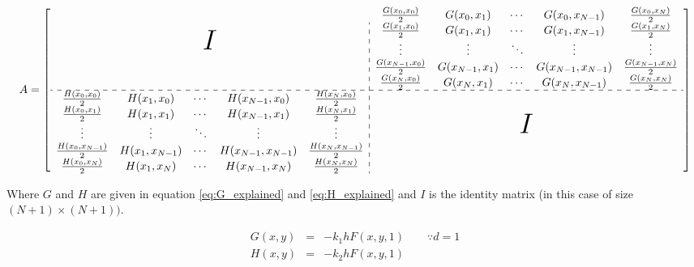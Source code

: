 \begin{landscape}

\begin{equation}
A = 
\left[
\begin{array}{*{5}{c}:*{5}{c}}
\multicolumn{5}{c}{\multirow{5}{*}{\Huge{$I$}}} 
& \frac{G(x_0,x_0)}{2}
& G(x_0,x_1)
& \cdots
& G(x_0,x_{N-1})
& \frac{G(x_0,x_N)}{2} \\

&&&&& \frac{G(x_1,x_0)}{2}
& G(x_1,x_1) 
& \cdots
& G(x_{1},x_{N-1}) 
& \frac{G(x_{1},x_{N})}{2} \\

&&&&& \vdots
& \vdots
& \ddots
& \vdots
& \vdots\\

&&&&& \frac{G(x_{N-1},x_0)}{2}
& G(x_{N-1},x_{1}) 
& \cdots
& G(x_{N-1},x_{N-1}) 
& \frac{G(x_{N-1},x_{N})}{2} \\

&&&&& \frac{G(x_N,x_0)}{2} 
& G(x_{N},x_{1}) 
& \cdots
& G(x_{N},x_{N-1})
& \frac{G(x_{N},x_{N})}{2} \\
 \hdashline
 
\frac{H(x_0,x_0)}{2}
& H(x_1,x_0)
& \cdots
& H(x_{N-1},x_0)
& \frac{H(x_N,x_0)}{2} &
\multicolumn{5}{c}{\multirow{5}{*}{\Huge{$I$}}}
\\

\frac{H(x_0,x_1)}{2}
& H(x_1,x_1) 
& \cdots
& H(x_{N-1},x_1) 
& \frac{H(x_N,x_1)}{2} \\

\vdots
& \vdots
& \ddots
& \vdots
& \vdots\\

\frac{H(x_0,x_{N-1})}{2}
& H(x_1,x_{N-1}) 
& \cdots
& H(x_{N-1},x_{N-1}) 
& \frac{H(x_N,x_{N-1})}{2} \\

\frac{H(x_0,x_N)}{2} 
& H(x_1,x_N) 
& \cdots
& H(x_{N-1},x_{N})
& \frac{H(x_{N},x_{N})}{2} \\
\end{array}
\right]
\label{eq:A_matrix}
\end{equation}

Where $G$ and $H$ are given in equation \ref{eq:G_explained} and \ref{eq:H_explained} and $I$ is the identity matrix (in this case of size $(N+1) \times (N+1)).$

\begin{eqnarray}
G(x,y) &=&  -k_1 h F(x,y,1) \label{eq:G_explained} \qquad \because d = 1 \\
H(x,y) &=&  -k_2 h F(x,y,1)\label{eq:H_explained}
\end{eqnarray}




\end{landscape}
